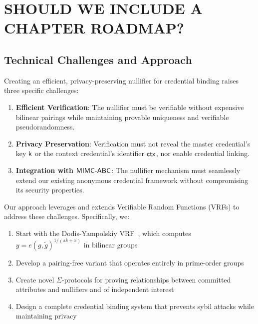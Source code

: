 \section{SHOULD WE INCLUDE A CHAPTER ROADMAP?}



\subsection{Technical Challenges and Approach}

Creating an efficient, privacy-preserving nullifier for credential binding raises three specific challenges:
\begin{enumerate}
    \item \textbf{Efficient Verification}: The nullifier must be verifiable without expensive bilinear pairings while maintaining provable uniqueness and verifiable pseudorandomness.
    
    \item \textbf{Privacy Preservation}: Verification must not reveal the master credential's key $\mathsf{k}$ or the context credential's identifier $\mathsf{ctx}$, nor enable credential linking.
    
    \item \textbf{Integration with $\mathsf{MIMC\text{-}ABC}$}: The nullifier mechanism must seamlessly extend our existing anonymous credential framework without compromising its security properties.
\end{enumerate}

Our approach leverages and extends Verifiable Random Functions (VRFs) to address these challenges. Specifically, we:

\begin{enumerate}
    \item Start with the Dodis-Yampolskiy VRF~\cite{hutchison_verifiable_2005}, which computes $y = e(g, \tilde{g})^{1/(sk+x)}$ in bilinear groups
    
    \item Develop a pairing-free variant that operates entirely in prime-order groups
    
    \item Create novel $\Sigma$-protocols for proving relationships between committed attributes and nullifiers and of independent interest
    
    \item Design a complete credential binding system that prevents sybil attacks while maintaining privacy
\end{enumerate}

